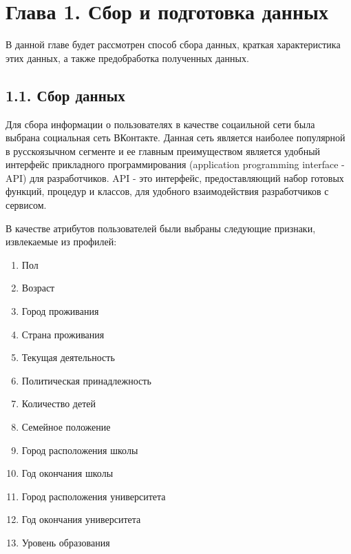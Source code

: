 \section{Глава 1. Сбор и подготовка данных}

В данной главе будет рассмотрен способ сбора данных, краткая характеристика этих данных, а также предобработка полученных данных.

\subsection{1.1. Сбор данных}

Для сбора информации о пользователях в качестве соцаильной сети была выбрана социальная сеть ВКонтакте. Данная сеть является наиболее популярной в русскоязычном сегменте и ее главным преимуществом является удобный интерфейс прикладного программирования (application programming interface - API) для разработчиков. API - это интерфейс, предоставляющий набор готовых функций, процедур и классов, для удобного взаимодействия разработчиков с сервисом. 

В качестве атрибутов пользователей были выбраны следующие признаки, извлекаемые из профилей:
\begin{enumerate}
\item Пол
\item Возраст
\item Город проживания
\item Страна проживания
\item Текущая деятельность
\item Политическая принадлежность
\item Количество детей
\item Семейное положение
\item Город расположения школы
\item Год окончания школы
\item Город расположения университета
\item Год окончания университета
\item Уровень образования
\end{enumerate}

